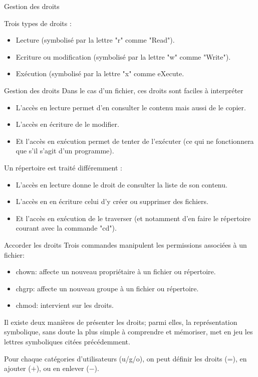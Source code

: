 \documentclass[10pt]{beamer}
\begin{document}
\begin{frame}{Gestion des droits}

\begin{alertblock}{Trois types de droits :}
\begin{itemize}
\item Lecture (symbolisé par la lettre "\alert{r}" comme "\alert{Read}").
\item Ecriture ou modification (symbolisé par la lettre "\alert{w}" comme "\alert{Write}").
\item Exécution (symbolisé par la lettre "\alert{x}" comme \alert{eXecute}.
\end{itemize}
\end{alertblock}
\end{frame}

\begin{frame}{Gestion des droits}
Dans le cas d'un fichier, ces droits sont faciles à interpréter
\begin{itemize}
\item L'accès en lecture permet d'en consulter le contenu mais aussi de le copier.
\item L'accès en écriture de le modifier.
\item Et l'accès en exécution permet de tenter de l'exécuter (ce qui ne fonctionnera que s'il s'agit d'un programme).
\end{itemize}

Un répertoire est traité différemment :
\begin{itemize}
\item L'accès en lecture donne le droit de consulter la liste de son contenu.
\item L'accès en en écriture celui d'y créer ou supprimer des fichiers.
\item Et l'accès en exécution de le traverser (et notamment d'en faire le répertoire
courant avec la commande "\alert{cd}").
\end{itemize}
\end{frame}


\begin{frame}{Accorder les droits}
Trois commandes manipulent les permissions associées à un fichier:
 \begin{itemize}
\item \alert{chown}: affecte un nouveau propriétaire à un fichier ou répertoire.
\item \alert{chgrp}: affecte un nouveau groupe à un fichier ou répertoire.
\item \alert{chmod}: intervient sur les droits.
\end{itemize}

Il existe deux manières de présenter les droits; parmi elles, la représentation symbolique, sans doute la plus simple à comprendre et mémoriser, met en jeu les lettres symboliques citées précédemment.

Pour chaque catégories d'utilisateurs (\alert{u}/\alert{g}/\alert{o}), on peut définir les droits (=), en ajouter ($+$), ou en enlever ($-$). 
\end{frame}
\end{document}
